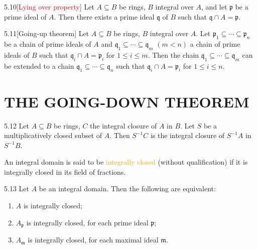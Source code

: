 \begin{theorem}{5.10}[\textcolor{red}{Lying over property}]
	Let $A\subseteq B$ be rings, $B$ integral over $A$, and let $\mathfrak{p}$ be a prime ideal of $A$. Then there exists a prime ideal $\mathfrak{q}$ of $B$ such that $\mathfrak{q}\cap A=\mathfrak{p}$.
\end{theorem}

\begin{theorem}{5.11}[Going-up theorem]
	Let $A\subseteq B$ be rings, $B$ integral over $A$. Let $\mathfrak{p}_1\subseteq\cdots\subseteq\mathfrak{p}_n$ be a chain of prime ideals of $A$ and $\mathfrak{q}_1\subseteq\cdots\subseteq\mathfrak{q}_m$ $(m<n)$ a chain of prime ideals of $B$ such that $\mathfrak{q}_i\cap A=\mathfrak{p}_i$ for $1\leqslant i\leqslant m$. Then the chain $\mathfrak{q}_1\subseteq\cdots\subseteq\mathfrak{q}_m$ can be extended to a chain $\mathfrak{q}_1\subseteq\cdots\subseteq\mathfrak{q}_n$ such that $\mathfrak{q}_i\cap A=\mathfrak{p}_i$ for $1\leqslant i\leqslant n$.
\end{theorem}

\section*{THE GOING-DOWN THEOREM}

\begin{proposition}{5.12}
	Let $A\subseteq B$ be rings, $C$ the integral closure of $A$ in $B$. Let $S$ be a multiplicatively closed subset of $A$. Then $S^{-1}C$ is the integral closure of $S^{-1}A$ in $S^{-1}B$.
\end{proposition}

An integral domain is said to be \textcolor{orange}{integrally closed} (without qualification) if it is integrally closed in its field of fractions.
	
\begin{proposition}{5.13}
	Let $A$ be an integral domain. Then the following are equivalent:
	\begin{enumerate}[label=\textup{(\roman*)}]
		\item $A$ is integrally closed;
		\item $A_\mathfrak{p}$ is integrally closed, for each prime ideal $\mathfrak{p}$;
		\item $A_\mathfrak{m}$ is integrally closed, for each maximal ideal $\mathfrak{m}$.
	\end{enumerate}
\end{proposition}

